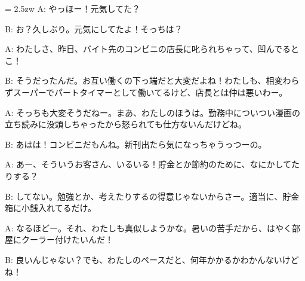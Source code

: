 \documentclass[11pt]{amsart}
\title{}
\author{}
\newenvironment{hangall}[1]{\hangindent = 2.5zw\everypar{\hangindent = 2.5zw}}{}
\begin{document}
\maketitle
\begin{hangall}{}%
A: やっほー！元気してた？



B: お？久しぶり。元気にしてたよ！そっちは？



A: わたしさ、昨日、バイト先のコンビニの店長に叱られちゃって、凹んでるとこ！



B: そうだったんだ。お互い働くの下っ端だと大変だよね！わたしも、相変わらずスーパーでパートタイマーとして働いてるけど、店長とは仲は悪いわー。



A: そっちも大変そうだねー。まあ、わたしのほうは。勤務中についつい漫画の立ち読みに没頭しちゃったから怒られても仕方ないんだけどね。



B: あはは！コンビニだもんね。新刊出たら気になっちゃうっつーの。



A: あー、そういうお客さん、いるいる！貯金とか節約のために、なにかしてたりする？



B: してない。勉強とか、考えたりするの得意じゃないからさー。適当に、貯金箱に小銭入れてるだけ。



A: なるほどー。それ、わたしも真似しようかな。暑いの苦手だから、はやく部屋にクーラー付けたいんだ！



B: 良いんじゃない？でも、わたしのペースだと、何年かかるかわかんないけどね！\end{hangall}
\end{document}
